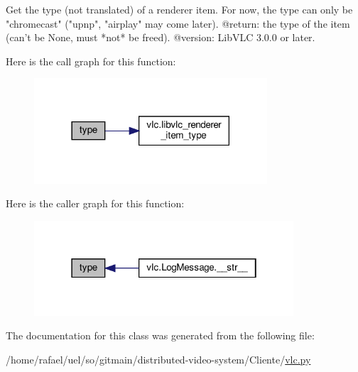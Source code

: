 \begin{DoxyVerb}Get the type (not translated) of a renderer item. For now, the type can only
be "chromecast" ("upnp", "airplay" may come later).
@return: the type of the item (can't be None, must *not* be freed).
@version: LibVLC 3.0.0 or later.
\end{DoxyVerb}
 Here is the call graph for this function\+:
\nopagebreak
\begin{figure}[H]
\begin{center}
\leavevmode
\includegraphics[width=246pt]{classvlc_1_1_renderer_aff464267544e4efc9b770c8320c8f199_cgraph}
\end{center}
\end{figure}
Here is the caller graph for this function\+:
\nopagebreak
\begin{figure}[H]
\begin{center}
\leavevmode
\includegraphics[width=274pt]{classvlc_1_1_renderer_aff464267544e4efc9b770c8320c8f199_icgraph}
\end{center}
\end{figure}


The documentation for this class was generated from the following file\+:\begin{DoxyCompactItemize}
\item 
/home/rafael/uel/so/gitmain/distributed-\/video-\/system/\+Cliente/\hyperlink{vlc_8py}{vlc.\+py}\end{DoxyCompactItemize}
